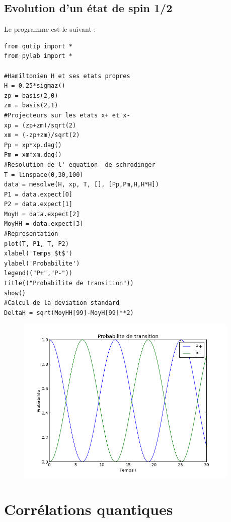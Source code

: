 \documentclass[a4paper,12pt]{book}
\numberwithin{equation}{section}
\begin{document}
\subsection{Evolution d'un état de spin 1/2}
Le programme est le suivant :
\begin{lstlisting}
from qutip import *
from pylab import *

#Hamiltonien H et ses etats propres
H = 0.25*sigmaz()
zp = basis(2,0)
zm = basis(2,1)
#Projecteurs sur les etats x+ et x-
xp = (zp+zm)/sqrt(2)
xm = (-zp+zm)/sqrt(2)
Pp = xp*xp.dag()
Pm = xm*xm.dag()
#Resolution de l' equation  de schrodinger
T = linspace(0,30,100)
data = mesolve(H, xp, T, [], [Pp,Pm,H,H*H])
P1 = data.expect[0]
P2 = data.expect[1]
MoyH = data.expect[2]
MoyHH = data.expect[3]
#Representation
plot(T, P1, T, P2)
xlabel('Temps $t$')
ylabel('Probabilite')
legend(("P+","P-"))
title(("Probabilite de transition"))
show()
#Calcul de la deviation standard
DeltaH = sqrt(MoyHH[99]-MoyH[99]**2)
\end{lstlisting}

\begin{figure}[!h]
\begin{center}
\includegraphics[height=8cm]{Images/Spin1_2.png}
\end{center}
\end{figure}

\section{Corrélations quantiques}
\end{document}
